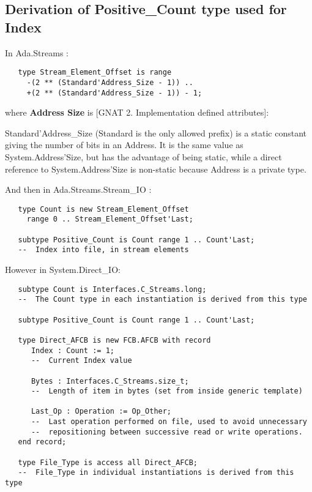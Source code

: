 \documentclass[a4paper,10pt]{article}
\begin{document}
\subsection{Derivation of Positive\_Count type used for Index}

In Ada.Streams :

\begin{verbatim}
   type Stream_Element_Offset is range
     -(2 ** (Standard'Address_Size - 1)) ..
     +(2 ** (Standard'Address_Size - 1)) - 1;
\end{verbatim}

where \textbf{Address Size} is [GNAT 2. Implementation defined attributes]:

Standard'Address\_Size (Standard is the only allowed prefix) is a static constant giving
the number of bits in an Address. It is the same value as System.Address'Size, but has
the advantage of being static, while a direct reference to System.Address’Size is non-static
because Address is a private type.


And then in Ada.Streams.Stream\_IO :

\begin{verbatim}
   type Count is new Stream_Element_Offset
     range 0 .. Stream_Element_Offset'Last;

   subtype Positive_Count is Count range 1 .. Count'Last;
   --  Index into file, in stream elements
\end{verbatim}

However in System.Direct\_IO:

\begin{verbatim}
   subtype Count is Interfaces.C_Streams.long;
   --  The Count type in each instantiation is derived from this type

   subtype Positive_Count is Count range 1 .. Count'Last;

   type Direct_AFCB is new FCB.AFCB with record
      Index : Count := 1;
      --  Current Index value

      Bytes : Interfaces.C_Streams.size_t;
      --  Length of item in bytes (set from inside generic template)

      Last_Op : Operation := Op_Other;
      --  Last operation performed on file, used to avoid unnecessary
      --  repositioning between successive read or write operations.
   end record;

   type File_Type is access all Direct_AFCB;
   --  File_Type in individual instantiations is derived from this type
\end{verbatim}
\end{document}

